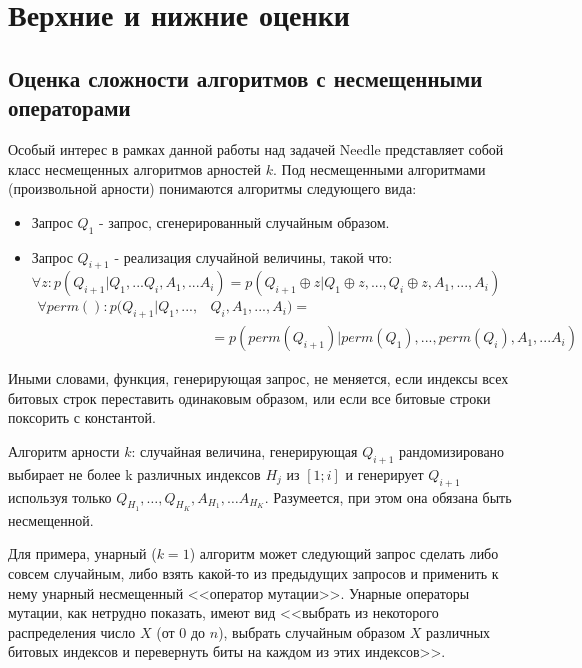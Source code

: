\newcommand{\cupdot}{\mathbin{\mathaccent\cdot\cup}}

\chapter{Верхние и нижние оценки}
\label{chapter3}


\section{Оценка сложности алгоритмов с несмещенными операторами}

Особый интерес в рамках данной работы над задачей Needle представляет собой класс несмещенных алгоритмов арностей $k$. Под несмещенными алгоритмами (произвольной арности) понимаются алгоритмы
следующего вида:

\begin{itemize}
   \item Запрос $Q_1$ - запрос, сгенерированный случайным образом.
   \item Запрос $Q_{i+1}$ - реализация случайной величины, такой что:
    $ \forall z: p(Q_{i+1} | Q_1, ... Q_i, A_1, ... A_i) =  
     p(Q_{i+1} \oplus z | Q_1 \oplus z, ..., Q_i \oplus z, A_1, ..., A_i) $
    \begin{align*}
    \forall perm():  p(Q_{i+1} | Q_1, ..., & Q_i, A_1, ..., A_i) = \\ &= p(perm(Q_{i+1}) |perm(Q_1), ..., perm(Q_i), A_1, ... A_i) 
    \end{align*}
  \end{itemize}
         
Иными словами, функция, генерирующая запрос, не меняется, если индексы всех битовых строк переставить одинаковым образом, или если все битовые строки поксорить с константой. 

Алгоритм арности $k$: случайная величина, генерирующая $Q_{i+1}$ рандомизировано выбирает не более k различных индексов $H_j$ из $[1; i]$ и генерирует $Q_{i+1}$ используя только 
$Q_{H_1}, \ldots, Q_{H_K}, A_{H_1}, \ldots A_{H_K}$. Разумеется, при этом она обязана быть несмещенной.

Для примера, унарный ($k = 1$) алгоритм может следующий запрос сделать либо совсем случайным, либо взять какой-то из предыдущих запросов и применить к нему унарный несмещенный <<оператор мутации>>. 
Унарные операторы мутации, как нетрудно показать, имеют вид <<выбрать из некоторого распределения число $X$ (от 0 до $n$), выбрать случайным образом $X$ различных битовых индексов и перевернуть биты на 
каждом из этих индексов>>.

